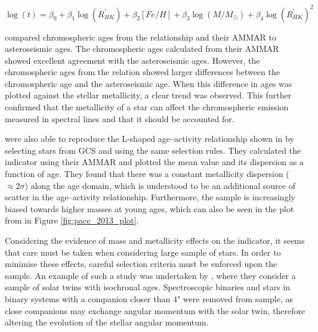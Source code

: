 \begin{equation}
    \log(t) = \beta_{0} + \beta_{1}\log(R^{'}_{HK}) + \beta_{2}[Fe/H] + \beta_{3}\log(M/M_{\odot}) + \beta_{4}\log(R^{'}_{HK})^{2}
    \label{Eq:AMMAR}
\end{equation}

\citet{Lorenzo_Oliveira_etal_2016} compared chromospheric ages from the \citet{Mamajek_Hillenbrand_2008} relationship and their AMMAR to asteroseismic ages. The chromospheric ages calculated from their AMMAR showed excellent agreement with the asteroseismic ages. However, the chromospheric ages from the \citet{Mamajek_Hillenbrand_2008} relation showed larger differences between the chromospheric age and the asteroseismic age. When this difference in ages was plotted against the stellar metallicity, a clear trend was observed. This further confirmed that the metallicity of a star can affect the chromospheric emission measured in \caII spectral lines and that it should be accounted for.

\citet{Lorenzo_Oliveira_etal_2016} were also able to reproduce the L-shaped age--activity relationship shown in \citet{Pace_2013} by selecting stars from GCS and using the same selection rules. They calculated the \Rprime indicator using their AMMAR and plotted the mean value and its dispersion as a function of age. They found that there was a constant metallicity dispersion ($\approx 2\sigma$) along the age domain, which is understood to be an additional source of scatter in the age--activity relationship. Furthermore, the sample is increasingly biased towards higher masses at young ages, which can also be seen in the plot from \citet{Pace_2013} in Figure \ref{fig:pace_2013_plot}.

Considering the evidence of mass and metallicity effects on the \Rprime indicator, it seems that care must be taken when considering large sample of stars. In order to minimise these effects, careful selection criteria must be enforced upon the sample. An example of such a study was undertaken by \citet{Lorenzo_Oliveira_etal_2018}, where they consider a sample of solar twins with isochronal ages. Spectroscopic binaries and stars in binary systems with a companion closer than 4" were removed from sample, as close companions may exchange angular momentum with the solar twin, therefore altering the evolution of the stellar angular momentum.

